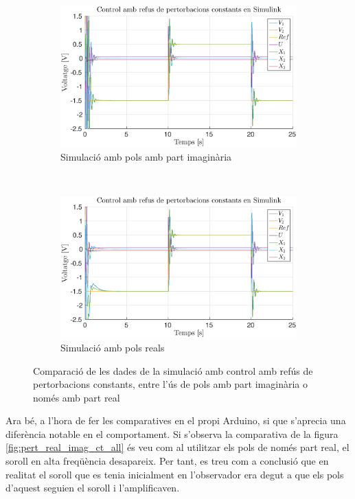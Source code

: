 \documentclass[12pt,a4paper,final,twoside,openright]{report}
\begin{document}
\begin{figure}[h]
\centering
	\begin{subfigure}[r]{0.8\textwidth}
		\includegraphics[width=\textwidth]{Imatges/pert_ct_all_sim_pols_imag_no_sin.eps}
		\caption{Simulació amb pols amb part imaginària}
	\end{subfigure}\\
	\vspace{15pt}
	\begin{subfigure}[r]{0.8\textwidth}
		\includegraphics[width=\textwidth]{Imatges/pert_ct_all_sim_pols_real_no_sin.eps}
		\caption{Simulació amb pols reals}
	\end{subfigure}
\caption{Comparació de les dades de la simulació amb control amb refús de pertorbacions constants, entre l'ús de pols amb part imaginària o només amb part real\label{fig:pert_real_imag_ct_all_sim_no_sin}}
\end{figure}

\newpage
Ara bé, a l'hora de fer les comparatives en el propi Arduino, si que s'aprecia una diferència notable en el comportament. Si s'observa la comparativa de la figura \ref{fig:pert_real_imag_ct_all} és veu com al utilitzar els pols de només part real, el soroll en alta freqüència desapareix. Per tant, es treu com a conclusió que en realitat el soroll que es tenia inicialment en l'observador era degut a que els pols d'aquest seguien el soroll i l'amplificaven.
\end{document}
